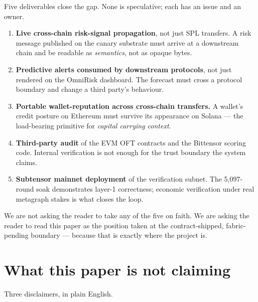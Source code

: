 \documentclass[11pt,a4paper]{article}
\begin{document}
Five deliverables close the gap. None is speculative; each has an
issue and an owner.

\begin{enumerate}
  \item \textbf{Live cross-chain risk-signal propagation}, not just
    SPL transfers. A risk message published on the canary substrate
    must arrive at a downstream chain and be readable as
    \emph{semantics}, not as opaque bytes.
  \item \textbf{Predictive alerts consumed by downstream protocols},
    not just rendered on the OmniRisk dashboard. The forecast must
    cross a protocol boundary and change a third party's behaviour.
  \item \textbf{Portable wallet-reputation across cross-chain
    transfers.} A wallet's credit posture on Ethereum must survive
    its appearance on Solana --- the load-bearing primitive for
    \emph{capital carrying context}.
  \item \textbf{Third-party audit} of the EVM OFT contracts and the
    Bittensor scoring code. Internal verification is not enough for
    the trust boundary the system claims.
  \item \textbf{Subtensor mainnet deployment} of the verification
    subnet. The 5{,}097-round soak demonstrates layer-1 correctness;
    economic verification under real metagraph stakes is what closes
    the loop.
\end{enumerate}

We are not asking the reader to take any of the five on faith. We are
asking the reader to read this paper as the position taken at the
contract-shipped, fabric-pending boundary --- because that is exactly
where the project is.

\section*{What this paper is not claiming}
\label{sec:not-claiming}

Three disclaimers, in plain English.
\end{document}
